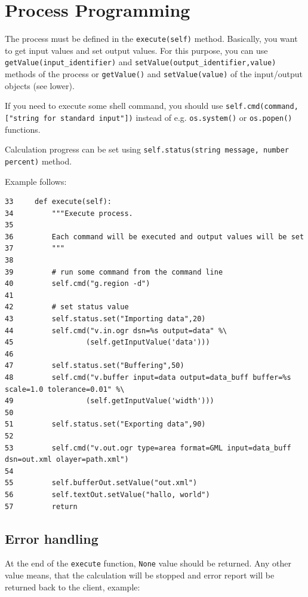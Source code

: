 \documentclass[a4paper,11pt]{report}
\begin{document}
\section{Process Programming}
    
The process must be defined in the \texttt{execute(self)} method. 
Basically, you want to get input values and set output values. For this
purpose, you can use \texttt{getValue(input\_identifier)} and
\texttt{setValue(output\_identifier,value)} methods of the process or
\texttt{getValue()} and \texttt{setValue(value)} of the input/output
objects (see lower).

If you need to execute some shell command, you should use
\texttt{self.cmd(command,["string for standard input"])} instead of e.g.
\texttt{os.system()} or \texttt{os.popen()} functions.

Calculation progress can be set using \texttt{self.status(string message,
number percent)} method.

Example follows:

\begin{verbatim}
33     def execute(self):
34         """Execute process.
35         
36         Each command will be executed and output values will be set
37         """
38 
39         # run some command from the command line
40         self.cmd("g.region -d")
41 
42         # set status value
43         self.status.set("Importing data",20)
44         self.cmd("v.in.ogr dsn=%s output=data" %\
45                 (self.getInputValue('data')))
46             
47         self.status.set("Buffering",50)
48         self.cmd("v.buffer input=data output=data_buff buffer=%s scale=1.0 tolerance=0.01" %\
49                 (self.getInputValue('width')))
50 
51         self.status.set("Exporting data",90)
52 
53         self.cmd("v.out.ogr type=area format=GML input=data_buff dsn=out.xml olayer=path.xml")
54         
55         self.bufferOut.setValue("out.xml")
56         self.textOut.setValue("hallo, world")
57         return
\end{verbatim}

\subsection{Error handling}
    
At the end of the \texttt{execute} function, \texttt{None} value should be returned. Any other 
value means, that the calculation will be stopped and error report will be
returned back to the client, example:
\end{document}
